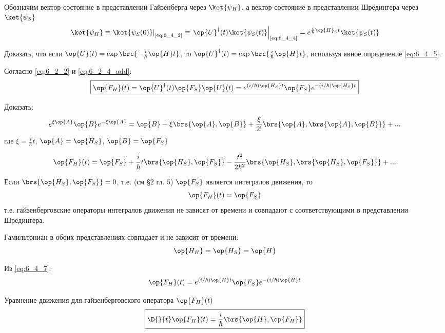Обозначим вектор-состояние в представлении Гайзенберга через $\ket{\psi_H}$, а вектор-состояние в представлении Шрёдингера через $\ket{\psi_S}$
\begin{equation}
\label{eq:6_4_6}
	\left. \ket{\psi_H} \equiv \ket{\psi_S(0)} \right|_\text{\eqref{eq:6_4_2}} \equiv 
	\left.  \op{U}^\dag(t) \ket{\psi_S(t)} \right|_\text{\eqref{eq:6_4_4}} =
	e^{\frac{i}{\hbar}\op{H}_St} \ket{\psi_S(t)}
\end{equation}

\begin{excr}
Доказать, что если $\op{U}(t)=\exp\brc{-\frac{i}{\hbar}\op{H}t}$, то $\op{U}^\dag(t) = \exp\brc{\frac{i}{\hbar}\op{H}t}$, используя явное определение \eqref{eq:6_4_5}.
\end{excr}

Согласно \eqref{eq:6_2_2} и \eqref{eq:6_2_4_add}:
\begin{equation}
\label{eq:6_4_7}
\boxed{
	\op{F_H}(t) = \op{U}^\dag(t) \op{F_S} \op{U}(t) = e^{(i/\hbar) \op{H_S}t} \op{F_S} e^{-(i/\hbar) \op{H_S}t}
}
\end{equation}

\begin{excr}
Доказать:
$$
e^{\xi \op{A}} \op{B} e^{-\xi \op{A}} = \op{B} + \xi \brs{\op{A}, \op{B}} + \frac{\xi}{2!} \brs{\op{A}, \brs{\op{A}, \op{B}}} + ...
$$
где $\xi = \frac{i}{\hbar} t$, $\op{A} = \op{H_S}$, $\op{B} = \op{F_S}$
\end{excr}

\begin{equation}
\label{eq:6_4_8}
\op{F_H}(t) = \op{F_S} + \frac{i}{\hbar} t \brs{\op{H_S}, \op{F_S}} - \frac{t^2}{2\hbar^2} \brs{\op{H_S}, \brs{\op{H_S}, \op{F_S}}} + ...
\end{equation}

Если $\brs{\op{H_S}, \op{F_S}} = 0$, т.е. (см \S 2 гл. 5) $\op{F_S}$ является интегралов движения, то
$$
\op{F_H}(t) = \op{F_S}
$$
т.е. гайзенберговские операторы интегралов движения не зависят от времени и совпадают с соответствующими в представлении Шрёдингера.

Гамильтониан в обоих представлениях совпадает и не зависит от времени:
$$
\op{H_H} = \op{H_S} = \op{H}
$$

Из \eqref{eq:6_4_7}:
\begin{equation}
\label{eq:6_4_9}
\op{F_H}(t) = e^{(i/\hbar)\op{H}t} \op{F_S} e^{-(i/\hbar)\op{H}t}
\end{equation}

Уравнение движения для гайзенберговского оператора $\op{F_H}(t)$
\begin{equation}
\label{eq:6_4_10}
\boxed{
	\D{}{t}\op{F_H}(t) = \frac{i}{\hbar} \brs{\op{H}, \op{F_H}}
}
\end{equation}

